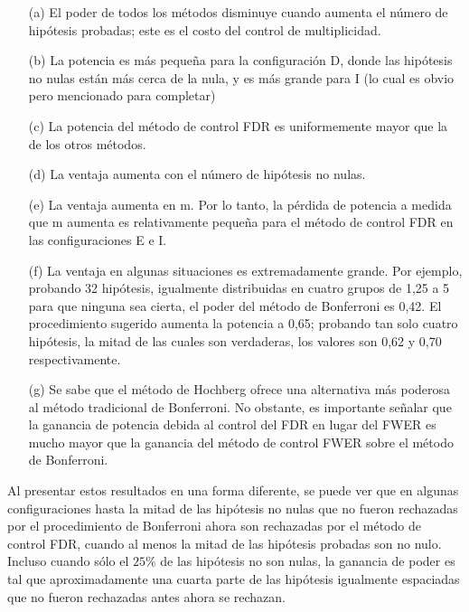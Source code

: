 \documentclass[11pt,letterpaper]{article}
\begin{document}
\begin{itemize}
\item[(a)] El poder de todos los métodos disminuye cuando aumenta el número de hipótesis probadas; este es el costo del control de multiplicidad. 
\item[(b)] La potencia es más pequeña para la configuración D, donde las hipótesis no nulas están más cerca de la nula, y es más grande para I (lo cual es obvio pero mencionado para completar)
\item[(c)] La potencia del método de control FDR es uniformemente mayor que la de los otros métodos.
\item[(d)] La ventaja aumenta con el número de hipótesis no nulas.
\item[(e)] La ventaja aumenta en m. Por lo tanto, la pérdida de potencia a medida que m aumenta es relativamente pequeña para el método de control FDR en las configuraciones E e I.
\item[(f)] La ventaja en algunas situaciones es extremadamente grande. Por ejemplo, probando 32 hipótesis, igualmente distribuidas en cuatro grupos de 1,25 a 5 para que ninguna sea cierta, el poder del método de Bonferroni es 0,42. El procedimiento sugerido aumenta la potencia a 0,65; probando tan solo cuatro hipótesis, la mitad de las cuales son verdaderas, los valores son 0,62 y 0,70 respectivamente.
\item[(g)] Se sabe que el método de Hochberg ofrece una alternativa más poderosa al método tradicional de Bonferroni. No obstante, es importante señalar que la ganancia de potencia debida al control del FDR en lugar del FWER es mucho mayor que la ganancia del método de control FWER sobre el método de Bonferroni.
\end{itemize}
Al presentar estos resultados en una forma diferente, se puede ver que en algunas configuraciones hasta la mitad de las hipótesis no nulas que no fueron rechazadas por el procedimiento de Bonferroni ahora son rechazadas por el método de control FDR, cuando al menos la mitad de las hipótesis probadas son no nulo. Incluso cuando sólo el $25\%$ de las hipótesis no son nulas, la ganancia de poder es tal que aproximadamente una cuarta parte de las hipótesis igualmente espaciadas que no fueron rechazadas antes ahora se rechazan.\\
\end{document}
